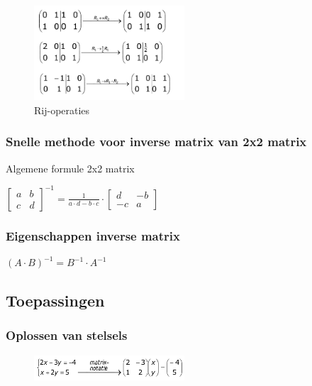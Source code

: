 \documentclass{article}
\begin{document}
\begin{figure}[H]
    \centering
    \includegraphics[width=0.5\textwidth]{inverse-matrix-berekenen.png}
    \caption{Rij-operaties}
\end{figure}

\subsubsection{Snelle methode voor inverse matrix van 2x2 matrix}

Algemene formule 2x2 matrix

$\begin{bmatrix}
a & b\\
c & d
\end{bmatrix}^{-1} = \frac{1}{a\cdot d - b\cdot c}\cdot 
\begin{bmatrix}
d & -b\\
-c & a
\end{bmatrix}$

\subsubsection{Eigenschappen inverse matrix}

$(A\cdot B)^{-1} = B^{-1}\cdot A^{-1}$



\subsection{Toepassingen}

\subsubsection{Oplossen van stelsels}

\begin{figure}[H]
    \centering
    \includegraphics[width=0.5\textwidth]{matrix-oplossen.png}
\end{figure}
\end{document}
